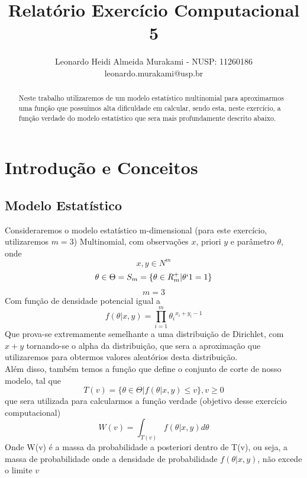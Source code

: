 \documentclass[twocolumn,amsmath,amssymb,floatfix]{revtex4}
\begin{document}

\title{Relatório Exercício Computacional 5}

\author{Leonardo Heidi Almeida Murakami - NUSP: 11260186 \\\small leonardo.murakami@usp.br} 

\begin{abstract}
\baselineskip 11pt
Neste trabalho utilizaremos de um modelo estatístico multinomial para aproximarmos uma função que possuímos alta dificuldade em calcular, sendo esta, neste exercício, a função verdade do modelo estatístico que sera mais profundamente descrito abaixo.
\end{abstract}

\maketitle
\section{Introdução e Conceitos}
\subsection{Modelo Estatístico}
\indent Consideraremos o modelo estatístico m-dimensional (para este exercício, utilizaremos $m=3$) Multinomial, com observações $x$, priori $y$ e parâmetro $\theta$, onde
\begin{equation}
    x, y \in N^{m}
\end{equation}
\begin{equation}
    \theta \in \Theta = S_m = \{\theta \in R^+_m | \theta`1 = 1\}
\end{equation}
\begin{equation}
    m=3
\end{equation}
Com função de densidade potencial igual a
\begin{equation}
    f(\theta | x,y) = \prod_{i=1}^m \theta{_i}^{x_i + y_i - 1}
\end{equation}
\indent Que prova-se extremamente semelhante a uma distribuição de Dirichlet, com $x + y$ tornando-se o alpha da distribuição, que sera a aproximação que utilizaremos para obtermos valores aleatórios desta distribuição. \\
\indent Além disso, também temos a função que define o conjunto de corte de nosso modelo, tal que
\begin{equation}
    T(v) = \{\theta \in \Theta | f(\theta | x,y) \leq v\}, v \geq 0
\end{equation}
que sera utilizada para calcularmos a função verdade (objetivo desse exercício computacional)
\begin{equation}
    W(v) = \int_{T(v)}f(\theta | x, y)d\theta
\end{equation}
\indent Onde W(v) é a massa da probabilidade a posteriori dentro de T(v), ou seja, a massa de probabilidade onde a densidade de probabilidade $f(\theta | x,y)$, não excede o limite $v$
\end{document}
